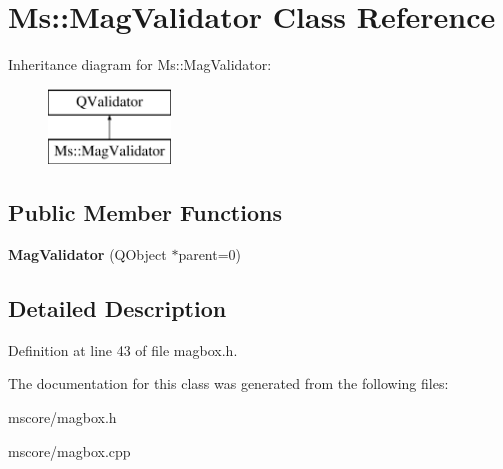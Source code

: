 \hypertarget{class_ms_1_1_mag_validator}{}\section{Ms\+:\+:Mag\+Validator Class Reference}
\label{class_ms_1_1_mag_validator}
Inheritance diagram for Ms\+:\+:Mag\+Validator\+:\begin{figure}[H]
\begin{center}
\leavevmode
\includegraphics[height=2.000000cm]{class_ms_1_1_mag_validator}
\end{center}
\end{figure}
\subsection*{Public Member Functions}
\begin{DoxyCompactItemize}
\item 
\mbox{\label{class_ms_1_1_mag_validator_ab78588c5cbea1f58e2f82a875ba6f4cc}} 
{\bfseries Mag\+Validator} (Q\+Object $\ast$parent=0)
\end{DoxyCompactItemize}


\subsection{Detailed Description}


Definition at line 43 of file magbox.\+h.



The documentation for this class was generated from the following files\+:\begin{DoxyCompactItemize}
\item 
mscore/magbox.\+h\item 
mscore/magbox.\+cpp\end{DoxyCompactItemize}
